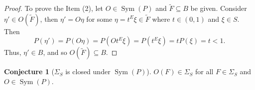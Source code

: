 \documentclass{article}
\theoremstyle{definition}
\newcommand\Sym{\operatorname{Sym}}
\theoremstyle{theorem}
\newtheorem{conjecture}[theorem]{Conjecture}
\begin{document}
\begin{framed}
\begin{proof}
To prove the Item (2), let $O\in \Sym(P)$ and $\widetilde{F}\subseteq B$ be given. Consider $\eta'\in O(\widetilde{F})$, then $\eta' = O\eta$ for some $\eta = t^E \xi\in \widetilde{F}$ where $t\in (0,1)$ and $\xi\in S$. Then
\begin{equation*}
    P(\eta') = P(O \eta) = P(O t^E\xi) = P(t^E \xi) =  tP(\xi) = t < 1.
\end{equation*}
Thus, $\eta'\in B$, and so $O(\widetilde{F})\subseteq B$. 
\end{proof}




\end{framed}





















\begin{conjecture}[$\Sigma_S$ is closed under $\Sym(P)$]\label{prop:Sigma_closed}
$O(F) \in \Sigma_S$ for all $F\in \Sigma_S$ and  $O\in \Sym(P)$. 
\end{conjecture}
\end{document}

